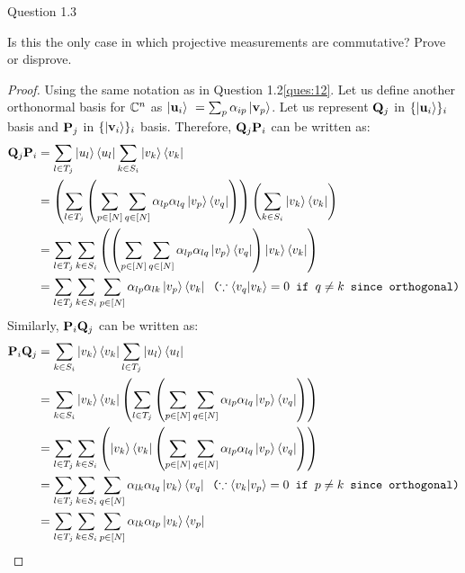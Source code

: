 \begin{solution}{Question 1.3}\label{ques:13}
    \begin{question}
    Is this the only case in which projective measurements are commutative? Prove or disprove.
    \end{question}
    \tcblower{}
    \begin{proof}
    Using the same notation as in Question 1.2\ref{ques:12}. Let us define another orthonormal basis for $\mathbb{C}^n$ as $\ket{\mathbf{u}_i}\ = \sum_p \alpha_{ip}\ket{\mathbf{v}_p}$. Let us represent $\mathbf{Q}_j$ in $\{\ket{\mathbf{u}_i}\}_i$ basis and $\mathbf{P}_j$ in $\{\ket{\mathbf{v}_i}\}_i$ basis. Therefore, $\mathbf{Q}_j \mathbf{P}_i$ can be written as:
    \begin{equation}
        \begin{split}
            \mathbf{Q}_j\mathbf{P}_i &= \sum_{l\in T_j}\ket{u_l}\bra{u_l} \sum_{k\in S_i}\ket{v_k}\bra{v_k} \\
            &=\left( \sum_{l\in T_j} \left( \sum_{p\in[N]}\sum_{q\in[N]}\alpha_{lp}\alpha_{lq}\ket{v_p}\bra{v_q}\right) \right) \left( \sum_{k\in S_i} \ket{v_k}\bra{v_k} \right)\\
            &= \sum_{l\in T_j}\sum_{k\in S_i} \left( \left( \sum_{p\in[N]}\sum_{q\in[N]}\alpha_{lp}\alpha_{lq}\ket{v_p}\bra{v_q} \right) \ket{v_k}\bra{v_k} \right)\\
            &= \sum_{l\in T_j} \sum_{k\in S_i} \sum_{p\in [N]} \alpha_{lp}\alpha_{lk}\ket{v_p}\bra{v_k} \texttt{ 
        ($\because \braket{v_q|v_k}=0$ if $q\neq k$ since orthogonal)}
        \end{split}
    \end{equation}
    Similarly, $\mathbf{P}_i\mathbf{Q}_j$ can be written as:
    \begin{equation}
        \begin{split}
            \bfP_i\bfQ_j &= \sum_{k\in S_i}\ketbra{v_k} \sum_{l\in T_j}\ket{u_l}\bra{u_l}  \\
            &=\sum_{k\in S_i}\ketbra{v_k} \left(\sum_{l\in T_j} \left( \sum_{p\in[N]}\sum_{q\in[N]}\alpha_{lp}\alpha_{lq}\ketbraa{v_p}{v_q}\right) \right)\\
            &= \sum_{l\in T_j}\sum_{k\in S_i} \left( \ketbra{v_k} \left( \sum_{p\in[N]}\sum_{q\in[N]}\alpha_{lp}\alpha_{lq}\ketbraa{v_p}{v_q} \right) \right)\\
            &= \sum_{l\in T_j} \sum_{k\in S_i} \sum_{q\in [N]} \alpha_{lk}\alpha_{lq}\ketbraa{v_k}{v_q} \texttt{ 
        ($\because \braket{v_k|v_p}=0$ if $p\neq k$ since orthogonal)}\\
            &= \sum_{l\in T_j} \sum_{k\in S_i} \sum_{p\in [N]} \alpha_{lk}\alpha_{lp}\ketbraa{v_k}{v_p}

\end{split}
\end{equation}
\end{proof}
\end{solution}
